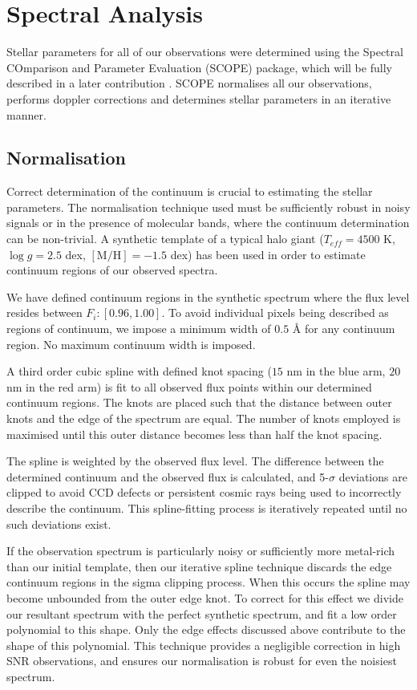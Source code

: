 \documentclass{emulateapj}
\begin{document}

\section{Spectral Analysis}
\label{sec:spectral-analysis}

Stellar parameters for all of our observations were determined using the Spectral COmparison and Parameter Evaluation (SCOPE) package, which will be fully described in a later contribution \citep{Casey;et-al_2012d}. SCOPE normalises all our observations, performs doppler corrections and determines stellar parameters in an iterative manner.

\subsection{Normalisation}
Correct determination of the continuum is crucial to estimating the stellar parameters. The normalisation technique used must be sufficiently robust in noisy signals or in the presence of molecular bands, where the continuum determination can be non-trivial. A synthetic template of a typical halo giant ($T_{eff} = 4500$ K, $\log{g} = 2.5$ dex, $[\mbox{M}/\mbox{H}] = -1.5$ dex) has been used in order to estimate continuum regions of our observed spectra.

We have defined continuum regions in the synthetic spectrum where the flux level resides between $F_i: [0.96, 1.00]$. To avoid individual pixels being described as regions of continuum, we impose a minimum width of $0.5$ \AA{} for any continuum region. No maximum continuum width is imposed.

A third order cubic spline with defined knot spacing ($15$ nm in the blue arm, $20$ nm in the red arm) is fit to all observed flux points within our determined continuum regions. The knots are placed such that the distance between outer knots and the edge of the spectrum are equal. The number of knots employed is maximised until this outer distance becomes less than half the knot spacing.

The spline is weighted by the observed flux level. The difference between the determined continuum and the observed flux is calculated, and 5-$\sigma$ deviations are clipped to avoid CCD defects or persistent cosmic rays being used to incorrectly describe the continuum. This spline-fitting process is iteratively repeated until no such deviations exist.

If the observation spectrum is particularly noisy or sufficiently more metal-rich than our initial template, then our iterative spline technique discards the edge continuum regions in the sigma clipping process. When this occurs the spline may become unbounded from the outer edge knot. To correct for this effect we divide our resultant spectrum with the perfect synthetic spectrum, and fit a low order polynomial to this shape. Only the edge effects discussed above contribute to the shape of this polynomial. This technique provides a negligible correction in high SNR observations, and ensures our normalisation is robust for even the noisiest spectrum. 
\end{document}
